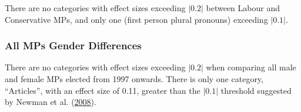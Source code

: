\documentclass[]{article}
\begin{document}
There are no categories with effect sizes exceeding \(|0.2|\) between
Labour and Conservative MPs, and only one (first person plural pronouns)
exceeding \(|0.1|\).

\hypertarget{all-mps-gender-differences}{%
\subsubsection{All MPs Gender
Differences}\label{all-mps-gender-differences}}

There are no categories with effect sizes exceeding \(|0.2|\) when
comparing all male and female MPs elected from 1997 onwards. There is
only one category, ``Articles'', with an effect size of 0.11, greater
than the \(|0.1|\) threshold suggested by Newman et al.
(\protect\hyperlink{ref-newman2008}{2008}).
\end{document}
